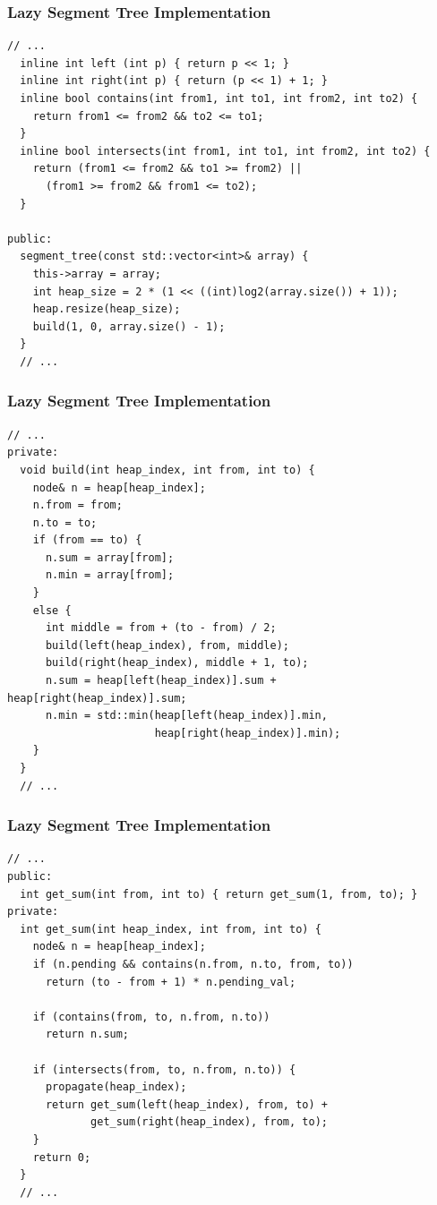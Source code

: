 \documentclass{beamer}
\begin{document}
\begin{frame}[containsverbatim]
\frametitle{Lazy Segment Tree Implementation}

\scriptsize

\begin{lstlisting}[mathescape]
  // ...
  inline int left (int p) { return p << 1; }
  inline int right(int p) { return (p << 1) + 1; }
  inline bool contains(int from1, int to1, int from2, int to2) {
    return from1 <= from2 && to2 <= to1;
  }
  inline bool intersects(int from1, int to1, int from2, int to2) {
    return (from1 <= from2 && to1 >= from2) ||
      (from1 >= from2 && from1 <= to2);
  }

public:
  segment_tree(const std::vector<int>& array) {
    this->array = array;
    int heap_size = 2 * (1 << ((int)log2(array.size()) + 1));
    heap.resize(heap_size);
    build(1, 0, array.size() - 1);
  }
  // ...
\end{lstlisting}

\end{frame}

\begin{frame}[containsverbatim]
\frametitle{Lazy Segment Tree Implementation}

\scriptsize

\begin{lstlisting}[mathescape]
  // ...
private:
  void build(int heap_index, int from, int to) {
    node& n = heap[heap_index];
    n.from = from;
    n.to = to;
    if (from == to) {
      n.sum = array[from];
      n.min = array[from];
    }
    else {
      int middle = from + (to - from) / 2;
      build(left(heap_index), from, middle);
      build(right(heap_index), middle + 1, to);
      n.sum = heap[left(heap_index)].sum + heap[right(heap_index)].sum;
      n.min = std::min(heap[left(heap_index)].min,
                       heap[right(heap_index)].min);
    }
  }
  // ...
\end{lstlisting}

\end{frame}

\begin{frame}[containsverbatim]
\frametitle{Lazy Segment Tree Implementation}

\scriptsize

\begin{lstlisting}[mathescape]
  // ...
public:
  int get_sum(int from, int to) { return get_sum(1, from, to); }
private:
  int get_sum(int heap_index, int from, int to) {
    node& n = heap[heap_index];
    if (n.pending && contains(n.from, n.to, from, to))
      return (to - from + 1) * n.pending_val;

    if (contains(from, to, n.from, n.to))
      return n.sum;

    if (intersects(from, to, n.from, n.to)) {
      propagate(heap_index);
      return get_sum(left(heap_index), from, to) +
             get_sum(right(heap_index), from, to);
    }
    return 0;
  }
  // ...
\end{lstlisting}

\end{frame}
\end{document}
